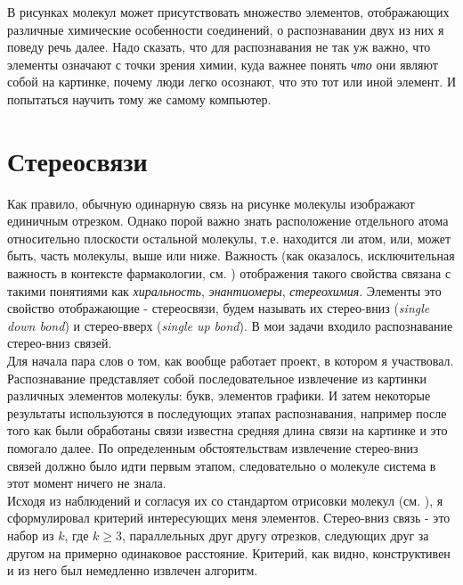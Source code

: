 \noindent
В рисунках молекул может присутствовать множество элементов, отображающих различные химические особенности соединений,
о распознавании двух из них я поведу речь далее. Надо сказать, что для распознавания не так уж важно, что элементы означают с точки 
зрения химии, куда важнее понять \emph{что} они являют собой на картинке, почему люди легко осознают, что это тот или 
иной элемент. И попытаться научить тому же самому компьютер. 

\section*{Стереосвязи}

Как правило, обычную одинарную связь на рисунке молекулы изображают единичным отрезком. Однако порой важно знать расположение
отдельного атома относительно плоскости остальной молекулы, т.е. находится ли атом, или, может быть, часть молекулы, выше или ниже.
Важность (как оказалось, исключительная важность в контексте фармакологии, см. \cite{chirality}) отображения такого свойства 
связана с такими понятиями как \emph{хиральность}, \emph{энантиомеры}, \emph{стереохимия}. Элементы это свойство отображающие - 
стереосвязи, будем называть их стерео-вниз (\emph{single down bond}) и стерео-вверх (\emph{single up bond}). В мои задачи 
входило распознавание стерео-вниз связей. \\

\noindent
Для начала пара слов о том, как вообще работает проект, в котором я участвовал. Распознавание представляет собой последовательное
извлечение из картинки различных элементов молекулы: букв, элементов графики. И затем некоторые результаты используются в последующих
этапах распознавания, например после того как были обработаны связи известна средняя длина связи на картинке и это помогало далее.
По определенным обстоятельствам извлечение стерео-вниз связей должно было идти первым этапом, следовательно о молекуле система в этот
момент ничего не знала. \\

\noindent
Исходя из наблюдений и согласуя их со стандартом отрисовки молекул (см. \cite{iupac}), я сформулировал критерий интересующих меня
элементов. Стерео-вниз связь - это набор из $k$, где $k \ge 3$, параллельных друг другу отрезков, следующих друг за другом
на примерно одинаковое расстояние. Критерий, как видно, конструктивен и из него был немедленно извлечен алгоритм.  

